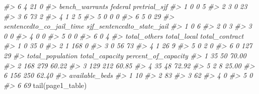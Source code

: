 \documentclass[
  12pt,
  openany]{book}
\newenvironment{Shaded}{\begin{snugshade}}{\end{snugshade}}
\newcommand{\CommentTok}[1]{\textcolor[rgb]{0.37,0.37,0.37}{\textit{#1}}}
\newcommand{\FunctionTok}[1]{\textcolor[rgb]{0,0,0}{#1}}
\newcommand{\NormalTok}[1]{#1}
\begin{document}
\begin{Shaded}
\begin{Highlighting}[]
\CommentTok{\#\textgreater{} 6                          4            21         0}
\CommentTok{\#\textgreater{}   bench\_warrants federal pretrial\_sjf}
\CommentTok{\#\textgreater{} 1              0       0            5}
\CommentTok{\#\textgreater{} 2              3       0           23}
\CommentTok{\#\textgreater{} 3              6      73            2}
\CommentTok{\#\textgreater{} 4              1       2            5}
\CommentTok{\#\textgreater{} 5              0       0            0}
\CommentTok{\#\textgreater{} 6              5       0           29}
\CommentTok{\#\textgreater{}   sentencedto\_co\_jail\_time sjf\_sentencedto\_state\_jail}
\CommentTok{\#\textgreater{} 1                        0                          6}
\CommentTok{\#\textgreater{} 2                        0                          3}
\CommentTok{\#\textgreater{} 3                        0                          0}
\CommentTok{\#\textgreater{} 4                        0                          0}
\CommentTok{\#\textgreater{} 5                        0                          0}
\CommentTok{\#\textgreater{} 6                        0                          4}
\CommentTok{\#\textgreater{}   total\_others total\_local total\_contract}
\CommentTok{\#\textgreater{} 1            0          35              0}
\CommentTok{\#\textgreater{} 2            1         168              0}
\CommentTok{\#\textgreater{} 3            0          56             73}
\CommentTok{\#\textgreater{} 4            1          26              9}
\CommentTok{\#\textgreater{} 5            0           2              0}
\CommentTok{\#\textgreater{} 6            0         127             29}
\CommentTok{\#\textgreater{}   total\_population total\_capacity percent\_of\_capacity}
\CommentTok{\#\textgreater{} 1               35             50               70.00}
\CommentTok{\#\textgreater{} 2              168            279               60.22}
\CommentTok{\#\textgreater{} 3              129            212               60.85}
\CommentTok{\#\textgreater{} 4               35             48               72.92}
\CommentTok{\#\textgreater{} 5                2              8               25.00}
\CommentTok{\#\textgreater{} 6              156            250               62.40}
\CommentTok{\#\textgreater{}   available\_beds}
\CommentTok{\#\textgreater{} 1             10}
\CommentTok{\#\textgreater{} 2             83}
\CommentTok{\#\textgreater{} 3             62}
\CommentTok{\#\textgreater{} 4              0}
\CommentTok{\#\textgreater{} 5              0}
\CommentTok{\#\textgreater{} 6             69}
\FunctionTok{tail}\NormalTok{(page1\_table)}

\end{Highlighting}
\end{Shaded}
\end{document}
